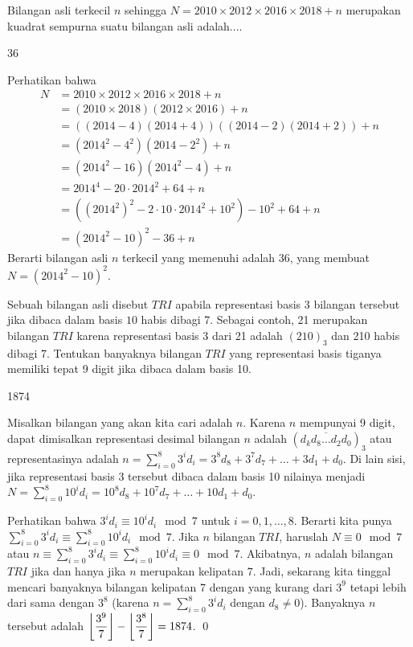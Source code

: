 \documentclass[11pt]{scrartcl}
\begin{document}
	\begin{soalbaru}
		Bilangan asli terkecil $n$ sehingga $N = 2010 \times 2012 \times 2016 \times 2018 + n$ merupakan kuadrat sempurna suatu bilangan asli adalah....
		
		\begin{jawaban}
		36
		\end{jawaban}
		\begin{solusi}
		Perhatikan bahwa \begin{align*}
		N &= 2010 \times 2012 \times 2016 \times 2018 + n\\
		  &= (2010 \times 2018)(2012 \times 2016) + n\\
		  &= ((2014-4)(2014+4))((2014-2)(2014+2))+n\\
		  &= (2014^2-4^2)(2014-2^2)+n\\
		  &= (2014^2-16)(2014^2-4)+n\\
		  &= 2014^4-20 \cdot 2014^2 + 64+n\\
		  &= ((2014^2)^2-2\cdot 10 \cdot 2014^2 + 10^2) -10^2+64+n\\
		  &= (2014^2-10)^2-36+n	  
		\end{align*}Berarti bilangan asli $n$ terkecil yang memenuhi adalah 36, yang membuat $N = (2014^2-10)^2$.
		\end{solusi}
	\end{soalbaru}
	
	\begin{soalbaru}
		Sebuah bilangan asli disebut $TRI$ apabila representasi basis $3$ bilangan tersebut jika dibaca dalam basis $10$ habis dibagi 7. Sebagai contoh, 21 merupakan bilangan $TRI$ karena representasi basis 3 dari 21 adalah $(210)_3$ dan 210 habis dibagi 7. Tentukan banyaknya bilangan $TRI$ yang representasi basis tiganya memiliki tepat 9 digit jika dibaca dalam basis 10.
		
		\begin{jawaban}
		1874
		\end{jawaban}
		\begin{solusi}
		Misalkan bilangan yang akan kita cari adalah $n$. Karena $n$ mempunyai 9 digit, dapat dimisalkan representasi desimal bilangan $n$ adalah $(\overline{d_kd_{8}\dots d_2 d_0})_3$ atau representasinya adalah $n = \sum_{i=0}^{8} 3^id_i = 3^8d_8+3^{7}d_{7}+\dots+3d_1+d_0$. Di lain sisi, jika representasi basis 3 tersebut dibaca dalam basis 10 nilainya menjadi $N = \sum_{i=0}^{8} 10^id_i = 10^8d_8+10^{7}d_{7}+\dots+10d_1+d_0$.
		
		Perhatikan bahwa $3^id_i \equiv 10^id_i \mod 7$ untuk $i=0,1,\dots,8$. Berarti kita punya $\sum_{i=0}^{8} 3^id_i \equiv \sum_{i=0}^{8} 10^id_i \mod 7$. Jika $n$ bilangan $TRI$, haruslah $N \equiv 0 \mod 7$ atau $n\equiv\sum_{i=0}^{8} 3^id_i \equiv \sum_{i=0}^{8} 10^id_i \equiv 0 \mod 7$. Akibatnya, $n$ adalah bilangan $TRI$ jika dan hanya jika $n$ merupakan kelipatan $7$. Jadi, sekarang kita tinggal mencari banyaknya bilangan kelipatan 7 dengan yang kurang dari $3^9$ tetapi lebih dari sama dengan $3^8$ (karena $n = \sum_{i=0}^{8} 3^id_i$ dengan $d_8 \neq 0$). Banyaknya $n$ tersebut adalah $\left\lfloor \dfrac{3^9}{7} \right\rfloor-\left\lfloor \dfrac{3^8}{7} \right\rfloor=1874$. \qed
		\end{solusi}
	\end{soalbaru}
	
\end{document}

